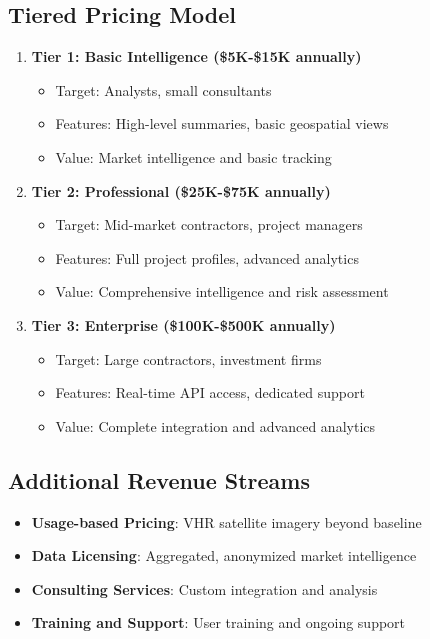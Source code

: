 \documentclass[business]{../templates/infraradar-main}
\begin{document}
\subsection{Tiered Pricing Model}
\begin{enumerate}
    \item \textbf{Tier 1: Basic Intelligence (\$5K-\$15K annually)}
    \begin{itemize}
        \item Target: Analysts, small consultants
        \item Features: High-level summaries, basic geospatial views
        \item Value: Market intelligence and basic tracking
    \end{itemize}
    
    \item \textbf{Tier 2: Professional (\$25K-\$75K annually)}
    \begin{itemize}
        \item Target: Mid-market contractors, project managers
        \item Features: Full project profiles, advanced analytics
        \item Value: Comprehensive intelligence and risk assessment
    \end{itemize}
    
    \item \textbf{Tier 3: Enterprise (\$100K-\$500K annually)}
    \begin{itemize}
        \item Target: Large contractors, investment firms
        \item Features: Real-time API access, dedicated support
        \item Value: Complete integration and advanced analytics
    \end{itemize}
\end{enumerate}

\subsection{Additional Revenue Streams}
\begin{itemize}
    \item \textbf{Usage-based Pricing}: VHR satellite imagery beyond baseline
    \item \textbf{Data Licensing}: Aggregated, anonymized market intelligence
    \item \textbf{Consulting Services}: Custom integration and analysis
    \item \textbf{Training and Support}: User training and ongoing support
\end{itemize}
\end{document}
